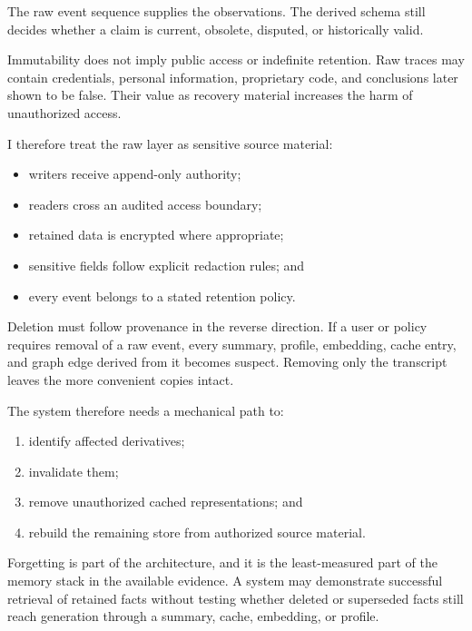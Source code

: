 The raw event sequence supplies the observations. The derived schema still decides whether a claim is current, obsolete, disputed, or historically valid.

Immutability does not imply public access or indefinite retention. Raw traces may contain credentials, personal information, proprietary code, and conclusions later shown to be false. Their value as recovery material increases the harm of unauthorized access.


I therefore treat the raw layer as sensitive source material:

\begin{itemize}
\tightlist
\item
  writers receive append-only authority;
\item
  readers cross an audited access boundary;
\item
  retained data is encrypted where appropriate;
\item
  sensitive fields follow explicit redaction rules; and
\item
  every event belongs to a stated retention policy.
\end{itemize}

Deletion must follow provenance in the reverse direction. If a user or policy requires removal of a raw event, every summary, profile, embedding, cache entry, and graph edge derived from it becomes suspect. Removing only the transcript leaves the more convenient copies intact.


The system therefore needs a mechanical path to:

\begin{enumerate}
\def\labelenumi{\arabic{enumi}.}
\tightlist
\item
  identify affected derivatives;
\item
  invalidate them;
\item
  remove unauthorized cached representations; and
\item
  rebuild the remaining store from authorized source material.
\end{enumerate}

Forgetting is part of the architecture, and it is the least-measured part of the memory stack in the available evidence. A system may demonstrate successful retrieval of retained facts without testing whether deleted or superseded facts still reach generation through a summary, cache, embedding, or profile.

